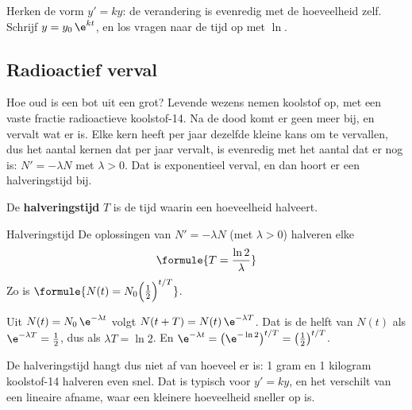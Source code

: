 \begin{werkwijze}
Herken de vorm $y' = ky$: de verandering is evenredig met de hoeveelheid zelf. Schrijf $y = y_0\,\e^{kt}$, en los vragen naar de tijd op met $\ln$.
\end{werkwijze}


\begin{oefeningen}
\end{oefeningen}

\subsection{Radioactief verval}

Hoe oud is een bot uit een grot? Levende wezens nemen koolstof op, met een vaste fractie radioactieve koolstof-14. Na de dood komt er geen meer bij, en vervalt wat er is. Elke kern heeft per jaar dezelfde kleine kans om te vervallen, dus het aantal kernen dat per jaar vervalt, is evenredig met het aantal dat er nog is: $N' = -\lambda N$ met $\lambda > 0$. Dat is exponentieel verval, en dan hoort er een halveringstijd bij.

\begin{theorie}
De \textbf{\textcolor{accent}{halveringstijd}} $T$ is de tijd waarin een hoeveelheid halveert.

\begin{stelling}{Halveringstijd}
De oplossingen van $N' = -\lambda N$ (met $\lambda > 0$) halveren elke
\[
\formule{T = \frac{\ln 2}{\lambda}}
\]
Zo is $\formule{N(t) = N_0 \Bigl(\frac12\Bigr)^{t/T}}$.
\end{stelling}

\begin{bewijs}
Uit $N(t) = N_0\,\e^{-\lambda t}$ volgt $N(t + T) = N(t)\,\e^{-\lambda T}$. Dat is de helft van $N(t)$ als $\e^{-\lambda T} = \tfrac12$, dus als $\lambda T = \ln 2$. En $\e^{-\lambda t} = \bigl(\e^{-\ln 2}\bigr)^{t/T} = \bigl(\tfrac12\bigr)^{t/T}$.
\end{bewijs}
\end{theorie}

De halveringstijd hangt dus niet af van hoeveel er is: 1 gram en 1 kilogram koolstof-14 halveren even snel. Dat is typisch voor $y' = ky$, en het verschilt van een lineaire afname, waar een kleinere hoeveelheid sneller op is.


